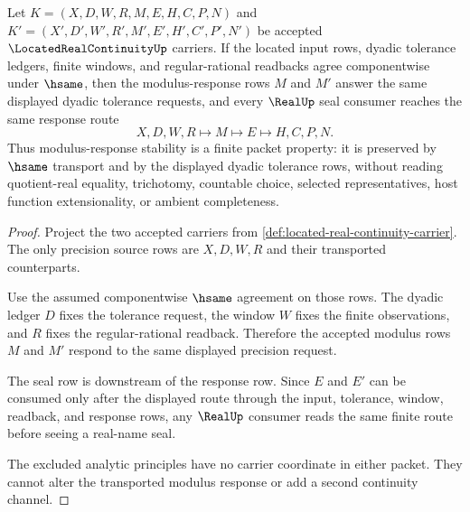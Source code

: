 \begin{theorem}
\label{thm:located-real-continuity-modulus-stability}
Let $K=(X,D,W,R,M,E,H,C,P,N)$ and $K'=(X',D',W',R',M',E',H',C',P',N')$ be accepted $\LocatedRealContinuityUp$ carriers. If the located input rows, dyadic tolerance ledgers, finite windows, and regular-rational readbacks agree componentwise under $\hsame$, then the modulus-response rows $M$ and $M'$ answer the same displayed dyadic tolerance requests, and every $\RealUp$ seal consumer reaches the same response route
$$
X,D,W,R \longmapsto M \longmapsto E \longmapsto H,C,P,N .
$$
Thus modulus-response stability is a finite packet property: it is preserved by $\hsame$ transport and by the displayed dyadic tolerance rows, without reading quotient-real equality, trichotomy, countable choice, selected representatives, host function extensionality, or ambient completeness.
\end{theorem}
\begin{proof}
Project the two accepted carriers from \autoref{def:located-real-continuity-carrier}. The only precision source rows are $X,D,W,R$ and their transported counterparts.

Use the assumed componentwise $\hsame$ agreement on those rows. The dyadic ledger $D$ fixes the tolerance request, the window $W$ fixes the finite observations, and $R$ fixes the regular-rational readback. Therefore the accepted modulus rows $M$ and $M'$ respond to the same displayed precision request.

The seal row is downstream of the response row. Since $E$ and $E'$ can be consumed only after the displayed route through the input, tolerance, window, readback, and response rows, any $\RealUp$ consumer reads the same finite route before seeing a real-name seal.

The excluded analytic principles have no carrier coordinate in either packet. They cannot alter the transported modulus response or add a second continuity channel.
\end{proof}

